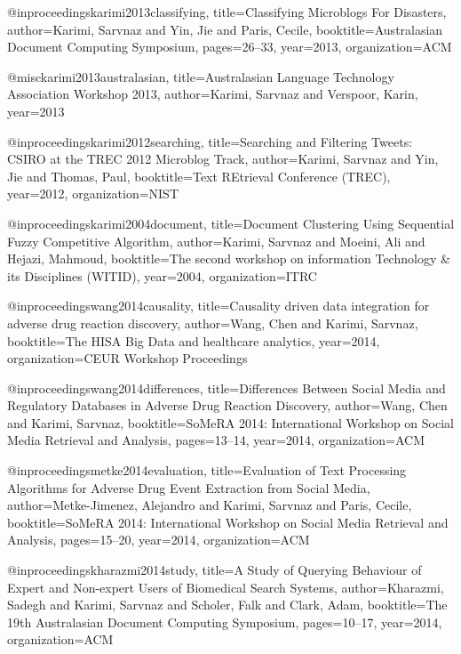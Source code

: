@inproceedings{karimi2013classifying,
  title={Classifying Microblogs For Disasters},
  author={Karimi, Sarvnaz and Yin, Jie and Paris, Cecile},
  booktitle={Australasian Document Computing Symposium},
  pages={26--33},
  year={2013},
  organization={ACM}
}

@misc{karimi2013australasian,
  title={Australasian Language Technology Association Workshop 2013},
  author={Karimi, Sarvnaz and Verspoor, Karin},
  year={2013}
}

@inproceedings{karimi2012searching,
  title={Searching and Filtering Tweets: CSIRO at the TREC 2012 Microblog Track},
  author={Karimi, Sarvnaz and Yin, Jie and Thomas, Paul},
  booktitle={Text REtrieval Conference (TREC)},
  year={2012},
  organization={NIST}
}

@inproceedings{karimi2004document,
  title={Document Clustering Using Sequential Fuzzy Competitive Algorithm},
  author={Karimi, Sarvnaz and Moeini, Ali and Hejazi, Mahmoud},
  booktitle={The second workshop on information Technology \& its Disciplines (WITID)},
  year={2004},
  organization={ITRC}
}

@inproceedings{wang2014causality,
  title={Causality driven data integration for adverse drug reaction discovery},
  author={Wang, Chen and Karimi, Sarvnaz},
  booktitle={The HISA Big Data and healthcare analytics},
  year={2014},
  organization={CEUR Workshop Proceedings}
}

@inproceedings{wang2014differences,
  title={Differences Between Social Media and Regulatory Databases in Adverse Drug Reaction Discovery},
  author={Wang, Chen and Karimi, Sarvnaz},
  booktitle={SoMeRA 2014: International Workshop on Social Media Retrieval and Analysis},
  pages={13--14},
  year={2014},
  organization={ACM}
}

@inproceedings{metke2014evaluation,
  title={Evaluation of Text Processing Algorithms for Adverse Drug Event Extraction from Social Media},
  author={Metke-Jimenez, Alejandro and Karimi, Sarvnaz and Paris, Cecile},
  booktitle={SoMeRA 2014: International Workshop on Social Media Retrieval and Analysis},
  pages={15--20},
  year={2014},
  organization={ACM}
}

@inproceedings{kharazmi2014study,
  title={A Study of Querying Behaviour of Expert and Non-expert Users of Biomedical Search Systems},
  author={Kharazmi, Sadegh and Karimi, Sarvnaz and Scholer, Falk and Clark, Adam},
  booktitle={The 19th Australasian Document Computing Symposium},
  pages={10--17},
  year={2014},
  organization={ACM}
}

